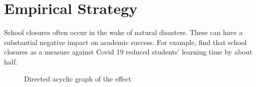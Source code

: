 
\section{Empirical Strategy}

School closures often occur in the wake of natural disasters. These can have a substantial negative impact on academic success. For example, \cite{Grewening_2020} find that school closures as a measure against Covid 19 reduced students' learning time by about half.


\begin{figure}[h]
	\centering
	\caption{Directed acyclic graph of the effect}
\end{figure}

